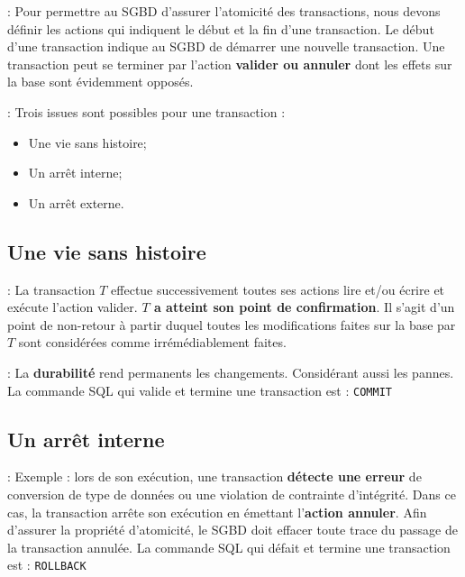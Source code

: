 \documentclass[10pt]{beamer}
\begin{document}
\begin{frame}{\secname : \subsecname}
    Pour permettre au SGBD d'assurer l'atomicité des transactions, nous devons définir les actions qui indiquent le début et la fin d'une transaction.
    Le début d'une transaction indique au SGBD de démarrer une nouvelle transaction.
    Une transaction peut se terminer par l'action \textbf{valider ou annuler} dont les effets sur la base sont évidemment opposés.
\end{frame}

\begin{frame}{\secname : \subsecname}
    Trois issues sont possibles pour une transaction :
    \begin{itemize}
        \item Une vie sans histoire;
        \item Un arrêt interne;
        \item Un arrêt externe.
    \end{itemize}
\end{frame}
\subsection{Une vie sans histoire}
\begin{frame}{\secname : \subsecname}
    La transaction $T$ effectue successivement toutes ses actions lire et/ou écrire et exécute l'action valider.
    \textbf{$T$ a atteint son point de confirmation}.  Il s'agit d'un point de non-retour à partir duquel toutes les modifications faites sur la base par $T$ sont considérées comme irrémédiablement faites.
\end{frame}

\begin{frame}{\secname : \subsecname}
    La \textbf{durabilité} rend permanents les changements. Considérant aussi les pannes.
    La commande SQL qui valide et termine une transaction est : \lstinline[language=plsql]!COMMIT!
\end{frame}

\subsection{Un arrêt interne}
\begin{frame}{\secname : \subsecname}
    Exemple : lors de son exécution, une transaction \textbf{détecte une erreur} de conversion de type de données ou une violation de contrainte d'intégrité.
    Dans ce cas, la transaction arrête son exécution en émettant l'\textbf{action annuler}.
    Afin d'assurer la propriété d'atomicité, le SGBD doit effacer toute trace du passage de la transaction annulée.
    La commande SQL qui défait et termine une transaction est : \lstinline[language=plsql]!ROLLBACK!
\end{frame}
\end{document}
